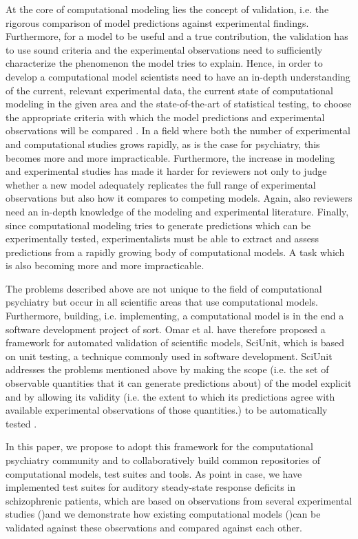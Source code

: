 \documentclass[a4paper,10pt]{article}
\begin{document}
At the core of computational modeling lies the concept of validation, i.e. the rigorous comparison of model predictions 
against experimental findings. Furthermore, for a model to be useful and a true contribution, the validation has to 
use sound criteria and the experimental observations need to sufficiently characterize the phenomenon the model tries to explain.
Hence, in order to develop a computational model scientists need to have an in-depth understanding of the current, relevant experimental data, 
the current state of computational modeling in the given area and the state-of-the-art of statistical testing, to choose the appropriate criteria
with which the model predictions and experimental observations will be compared \cite{Gerkin2013,Sarma2016}. In a field where both the number of experimental 
and computational
studies grows rapidly, as is the case for psychiatry, this becomes more and more impracticable.
Furthermore, the increase in modeling and experimental studies has made it harder for reviewers not only to judge whether a new model adequately 
replicates the full range of experimental observations but also how it compares to competing models. Again, also reviewers need an 
in-depth knowledge of the modeling
and experimental literature.
Finally, since computational modeling tries to generate predictions which can be experimentally tested, experimentalists must be able 
to extract and assess predictions from a rapidly growing body of computational models. A task which is also becoming more and more impracticable.

The problems described above are not unique to the field of computational psychiatry but occur in all scientific areas that use computational models.
Furthermore, building, i.e. implementing, a computational model is in the end a software development project of sort. Omar et al. \cite{Omar2014}
have therefore
proposed a framework for automated validation of scientific models, SciUnit, which is based on unit testing, a technique commonly used in software 
development.
SciUnit addresses the problems mentioned above by making the scope (i.e. the set of observable
quantities that it can generate predictions about) of the model explicit and by allowing its validity (i.e. the extent to which its predictions
agree with available experimental observations of those quantities.) to be automatically tested \cite{Omar2014}.

In this paper, we  propose to adopt this framework for the computational psychiatry community and to collaboratively build
common repositories of computational models, test suites and tools.
As point in case, we have implemented test suites for auditory steady-state response deficits in schizophrenic patients, which are based on 
observations from
several experimental studies (\cite{Krishnan2009,Vierling2008,Kwon1999})and we demonstrate
how existing computational models (\cite{Metzner2016,Beeman2013,Vierling2008,Metzner2017})can be validated against these observations and compared against each 
other.
\end{document}
